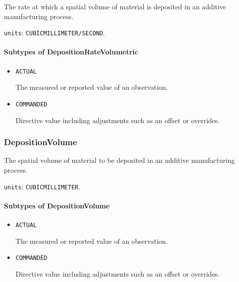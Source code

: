 The rate at which a spatial volume of material is deposited in an additive manufacturing process.


\texttt{units}: \texttt{CUBIC\textunderscore MILLIMETER/SECOND}.

\paragraph{Subtypes of DepositionRateVolumetric}\mbox{}
\label{sec:Subtypes of DepositionRateVolumetric}

\begin{itemize}

\item \texttt{ACTUAL}


The measured or reported value of an \gls{observation}.

\item \texttt{COMMANDED}


Directive value including adjustments such as an offset or overrides.


\end{itemize}





\subsubsection{DepositionVolume}
\label{sec:DepositionVolume}



The spatial volume of material to be deposited in an additive manufacturing process.


\texttt{units}: \texttt{CUBIC\textunderscore MILLIMETER}.

\paragraph{Subtypes of DepositionVolume}\mbox{}
\label{sec:Subtypes of DepositionVolume}

\begin{itemize}

\item \texttt{ACTUAL}


The measured or reported value of an \gls{observation}.

\item \texttt{COMMANDED}


Directive value including adjustments such as an offset or overrides.


\end{itemize}





